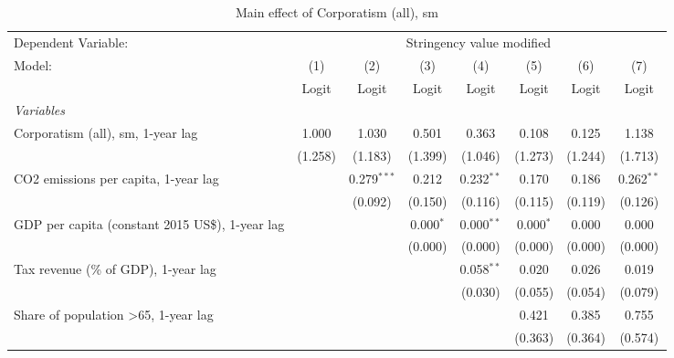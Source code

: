 
\begin{table}[htbp]
   \caption{Main effect of Corporatism (all), sm}
   \centering
   \begin{tabular}{lccccccc}
      \toprule
      Dependent Variable: & \multicolumn{7}{c}{Stringency value modified}\\
      Model:                                                & (1)     & (2)           & (3)         & (4)          & (5)         & (6)     & (7)\\  
                                                            &  Logit  & Logit         & Logit       & Logit        & Logit       & Logit   & Logit\\  
      \midrule
      \emph{Variables}\\
      Corporatism (all), sm, 1-year lag                     & 1.000   & 1.030         & 0.501       & 0.363        & 0.108       & 0.125   & 1.138\\   
                                                            & (1.258) & (1.183)       & (1.399)     & (1.046)      & (1.273)     & (1.244) & (1.713)\\   
      CO2 emissions per capita, 1-year lag                  &         & 0.279$^{***}$ & 0.212       & 0.232$^{**}$ & 0.170       & 0.186   & 0.262$^{**}$\\   
                                                            &         & (0.092)       & (0.150)     & (0.116)      & (0.115)     & (0.119) & (0.126)\\   
      GDP per capita (constant 2015 US\$), 1-year lag       &         &               & 0.000$^{*}$ & 0.000$^{**}$ & 0.000$^{*}$ & 0.000   & 0.000\\   
                                                            &         &               & (0.000)     & (0.000)      & (0.000)     & (0.000) & (0.000)\\   
      Tax revenue (\% of GDP), 1-year lag                   &         &               &             & 0.058$^{**}$ & 0.020       & 0.026   & 0.019\\   
                                                            &         &               &             & (0.030)      & (0.055)     & (0.054) & (0.079)\\   
      Share of population >65, 1-year lag                   &         &               &             &              & 0.421       & 0.385   & 0.755\\   
                                                            &         &               &             &              & (0.363)     & (0.364) & (0.574)\\   

\end{tabular}
\end{table}
